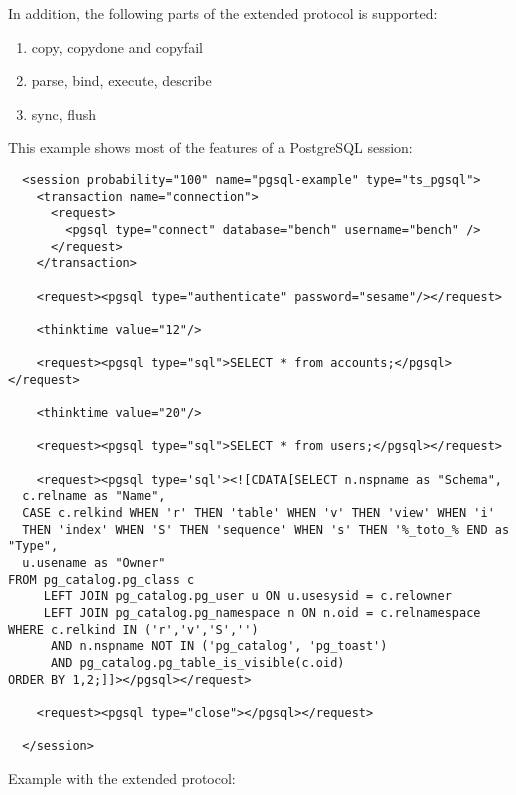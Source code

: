 \documentclass{TSUNG-en}
\begin{document}
In addition, the following parts of the extended protocol is supported:
\begin{enumerate}
\item copy, copydone and copyfail
\item parse, bind, execute, describe
\item sync, flush
\end{enumerate}

This example shows most of the features of a PostgreSQL session:

\begin{Verbatim}
  <session probability="100" name="pgsql-example" type="ts_pgsql">
    <transaction name="connection">
      <request>
        <pgsql type="connect" database="bench" username="bench" />
      </request>
    </transaction>

    <request><pgsql type="authenticate" password="sesame"/></request>

    <thinktime value="12"/>

    <request><pgsql type="sql">SELECT * from accounts;</pgsql></request>

    <thinktime value="20"/>

    <request><pgsql type="sql">SELECT * from users;</pgsql></request>

    <request><pgsql type='sql'><![CDATA[SELECT n.nspname as "Schema",
  c.relname as "Name",
  CASE c.relkind WHEN 'r' THEN 'table' WHEN 'v' THEN 'view' WHEN 'i'
  THEN 'index' WHEN 'S' THEN 'sequence' WHEN 's' THEN '%_toto_% END as "Type",
  u.usename as "Owner"
FROM pg_catalog.pg_class c
     LEFT JOIN pg_catalog.pg_user u ON u.usesysid = c.relowner
     LEFT JOIN pg_catalog.pg_namespace n ON n.oid = c.relnamespace
WHERE c.relkind IN ('r','v','S','')
      AND n.nspname NOT IN ('pg_catalog', 'pg_toast')
      AND pg_catalog.pg_table_is_visible(c.oid)
ORDER BY 1,2;]]></pgsql></request>

    <request><pgsql type="close"></pgsql></request>

  </session>
\end{Verbatim}

Example with the extended protocol:
\end{document}
